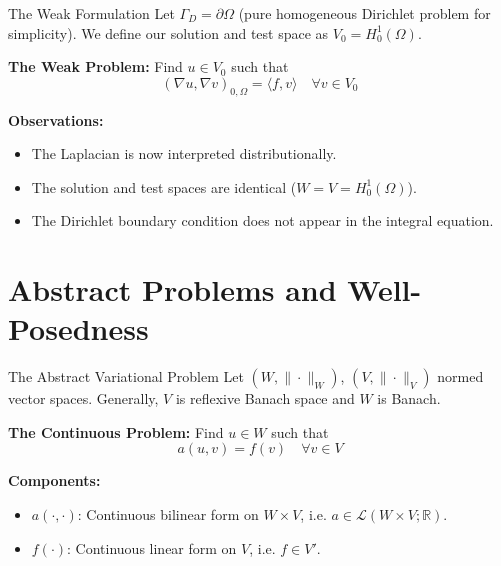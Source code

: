 \documentclass[aspectratio=169]{beamer}
\begin{document}
\begin{frame}{The Weak Formulation}
    Let $\Gamma_D = \partial\Omega$ (pure homogeneous Dirichlet problem for simplicity). We define our solution and test space as $V_0 = H^1_0(\Omega)$.

    \vspace{0.3cm}
    \textbf{The Weak Problem:}
    Find $u \in V_0$ such that
    $$ (\nabla u, \nabla v)_{0,\Omega} = \langle f, v \rangle \quad \forall v \in V_0 $$

    \vspace{0.3cm}
    \textbf{Observations:}
    \begin{itemize}
        \item The Laplacian is now interpreted distributionally.
        \item The solution and test spaces are identical ($W = V = H^1_0(\Omega)$).
        \item The Dirichlet boundary condition does not appear in the integral equation.
    \end{itemize}
\end{frame}

\section{Abstract Problems and Well-Posedness}

\begin{frame}{The Abstract Variational Problem}
    Let $(W,\|\cdot\|_W)$, $(V, \|\cdot \|_V)$ normed vector spaces. Generally, $V$ is reflexive Banach space and $W$ is Banach.

    \vspace{0.3cm}
    \textbf{The Continuous Problem:}
    Find $u \in W$ such that
    $$ a(u, v) = f(v) \quad \forall v \in V $$

    \vspace{0.3cm}
    \textbf{Components:}
    \begin{itemize}
        \item $a(\cdot, \cdot)$: Continuous bilinear form on $W \times V$, i.e. $a \in \mathcal{L}(W \times V; \mathbb{R})$.
        \item $f(\cdot)$: Continuous linear form on $V$, i.e. $f \in V'$.
    \end{itemize}
\end{frame}
\end{document}
